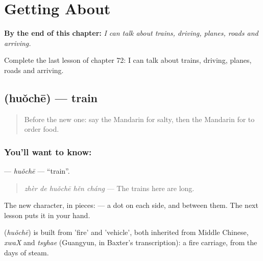 
\chapter{Getting About}
\label{ch:zh-getting-about}

\begin{chapteropening}
\textbf{By the end of this chapter:} \emph{I can talk about trains, driving, planes, roads and arriving.}

Complete the last lesson of chapter 72: I can talk about trains, driving, planes, roads and arriving.
\end{chapteropening}

\section[\texorpdfstring{\zh{火车} (huǒchē)}{火车 (huǒchē)}]{ (huǒchē) — train}

\label{lesson:ZH-C72-huoche}



\begin{quote}
Before the new one: say the Mandarin for salty, then the Mandarin for to order food.
\end{quote}

\subsection*{You'll want to know: }
\textbf{} — \emph{huǒchē} — \textquotedblleft{}train\textquotedblright{}.

\begin{quote}
\textbf{} \emph{zhèr de huǒchē hěn cháng} — The trains here are long.
\end{quote}

The new character, in pieces:  — a dot on each side, and  between them. The next lesson puts it in your hand.

\begin{cousinweb}
\textbf{} (\emph{huǒchē}) is built from  'fire' and  'vehicle', both inherited from Middle Chinese, \emph{xwaX} and \emph{tsyhae} (Guangyun, in Baxter's transcription): a fire carriage, from the days of steam.
\end{cousinweb}

